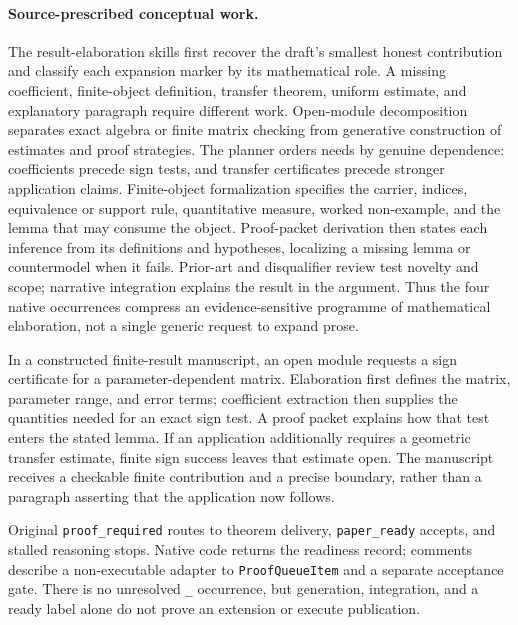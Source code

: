 \paragraph{Source-prescribed conceptual work.}
The result-elaboration skills first recover the draft's smallest honest contribution and classify each expansion marker by its mathematical role. A missing coefficient, finite-object definition, transfer theorem, uniform estimate, and explanatory paragraph require different work. Open-module decomposition separates exact algebra or finite matrix checking from generative construction of estimates and proof strategies. The planner orders needs by genuine dependence: coefficients precede sign tests, and transfer certificates precede stronger application claims. Finite-object formalization specifies the carrier, indices, equivalence or support rule, quantitative measure, worked non-example, and the lemma that may consume the object. Proof-packet derivation then states each inference from its definitions and hypotheses, localizing a missing lemma or countermodel when it fails. Prior-art and disqualifier review test novelty and scope; narrative integration explains the result in the argument. Thus the four native occurrences compress an evidence-sensitive programme of mathematical elaboration, not a single generic request to expand prose.

In a constructed finite-result manuscript, an open module requests a sign certificate for a parameter-dependent matrix. Elaboration first defines the matrix, parameter range, and error terms; coefficient extraction then supplies the quantities needed for an exact sign test. A proof packet explains how that test enters the stated lemma. If an application additionally requires a geometric transfer estimate, finite sign success leaves that estimate open. The manuscript receives a checkable finite contribution and a precise boundary, rather than a paragraph asserting that the application now follows.

Original \texttt{proof\_required} routes to theorem delivery, \texttt{paper\_ready} accepts, and stalled reasoning stops. Native code returns the readiness record; comments describe a non-executable adapter to \texttt{Proof\allowbreak Queue\allowbreak Item} and a separate acceptance gate. There is no unresolved \texttt{\_} occurrence, but generation, integration, and a ready label alone do not prove an extension or execute publication.




